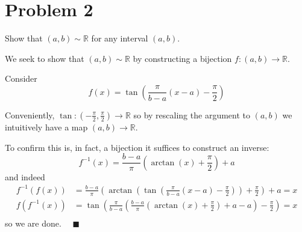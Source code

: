 \documentclass[11pt]{article}
\numberwithin{equation}{section}
\theoremstyle{definition}
\theoremstyle{remark}
\newcommand{\R}{\mathbb{R}}
\renewcommand{\qed}{\quad \blacksquare}
\begin{document}
\pagebreak
\section*{Problem 2}
Show that $(a,b)\sim \mathbb{R}$ for any interval $(a,b)$.

    \color{blue}
        We seek to show that $(a, b) \sim \R$ by constructing a bijection $f: (a, b) \to \R$. 

        Consider 
        \[f(x) = \tan(\frac{\pi}{b-a}(x - a) - \frac{\pi}{2})\]
    
        Conveniently, $\tan: (-\frac{\pi}{2}, \frac{\pi}{2}) \to \R$ so by rescaling the argument to $(a, b)$ we intuitively have a map $(a, b) \to \R$.

        To confirm this is, in fact, a bijection it suffices to construct an inverse: 
        \[f^{-1}(x) = \frac{b - a}{\pi}(\arctan(x) + \frac{\pi}{2}) + a\]
        and indeed 
        \begin{align*}
            f^{-1}(f(x)) &= \frac{b - a}{\pi}(\arctan(\tan(\frac{\pi}{b-a}(x - a) - \frac{\pi}{2})) + \frac{\pi}{2}) + a = x\\ 
            f(f^{-1}(x)) &= \tan(\frac{\pi}{b-a}(\frac{b - a}{\pi}(\arctan(x) + \frac{\pi}{2}) + a - a) - \frac{\pi}{2}) = x\\
        \end{align*}
        so we are done. $\qed$
    \color{black}

\pagebreak
\end{document}

